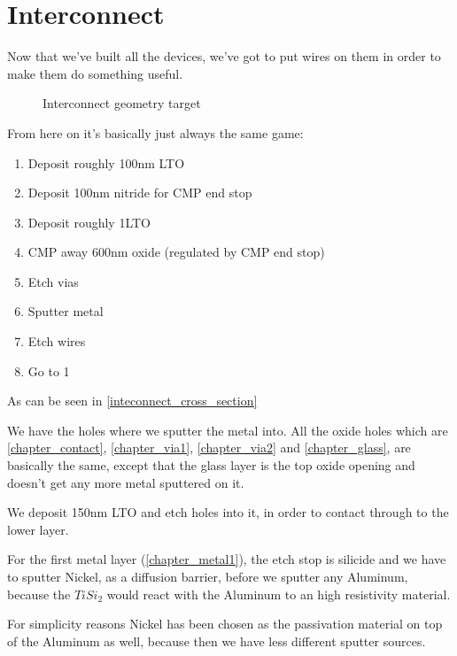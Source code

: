 \section{Interconnect}

Now that we've built all the devices, we've got to put wires on them in order to make them do something useful.

\begin{figure}[H]
	\centering
	\begin{tikzpicture}[node distance = 3cm, auto, thick,scale=\CrossAndTopSectionBig, every node/.style={transform shape}]
		
	\end{tikzpicture}
	\caption{Interconnect geometry target}
	\label{inteconnect_cross_section}
\end{figure}

From here on it's basically just always the same game:
\begin{enumerate}
	\item Deposit roughly 100nm LTO
	\item Deposit 100nm nitride for CMP end stop
	\item Deposit roughly 1\um LTO
	\item CMP away 600nm oxide (regulated by CMP end stop)
	\item Etch vias
	\item Sputter metal
	\item Etch wires
	\item Go to 1
\end{enumerate}

As can be seen in \autoref{inteconnect_cross_section}

We have the holes where we sputter the metal into.
All the oxide holes which are \autoref{chapter_contact}, \autoref{chapter_via1}, \autoref{chapter_via2} and \autoref{chapter_glass}, are basically the same,
except that the glass layer is the top oxide opening and doesn't get any more metal sputtered on it.

We deposit 150nm LTO and etch holes into it, in order to contact through to the lower layer.

For the first metal layer (\autoref{chapter_metal1}), the etch stop is silicide and we have to sputter Nickel, as a diffusion barrier, before we sputter any Aluminum,
because the $Ti Si_2$ would react with the Aluminum to an high resistivity material.

For simplicity reasons Nickel has been chosen as the passivation material on top of the Aluminum as well, because then we have less different sputter sources.

